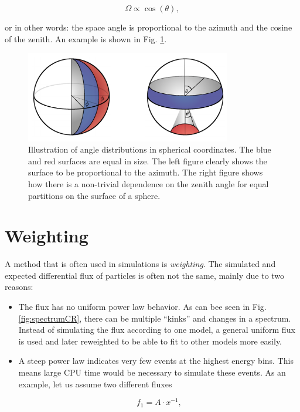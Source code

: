 \begin{appendices}
\begin{equation}
\Omega \propto \cos(\theta),
\end{equation}

\noindent or in other words: the space angle is proportional to the azimuth and the cosine of the zenith. An example is shown in Fig. \ref{fig:spaceangle}.

\begin{figure}
\centering
\includegraphics[width = 0.8\textwidth]{appendix/img/spaceangle.png}
\caption{Illustration of angle distributions in spherical coordinates. The blue and red surfaces are equal in size. The left figure clearly shows the surface to be proportional to the azimuth. The right figure shows how there is a non-trivial dependence on the zenith angle for equal partitions on the surface of a sphere.}
\label{fig:spaceangle}
\end{figure}

\section{Weighting}
\label{sec:weighting}
A method that is often used in simulations is \textit{weighting}. The simulated and expected differential flux of particles is often not the same, mainly due to two reasons:

\begin{itemize}
\item The flux has no uniform power law behavior. As can bee seen in Fig. \ref{fig:spectrumCR}, there can be multiple ``kinks'' and changes in a spectrum. Instead of simulating the flux according to one model, a general uniform flux is used and later reweighted to be able to fit to other models more easily.
\item A steep power law indicates very few events at the highest energy bins. This means large CPU time would be necessary to simulate these events. As an example, let us assume two different fluxes

\begin{equation}
f_1 = A \cdot x^{-1},
\end{equation}


\end{itemize}
\end{appendices}
